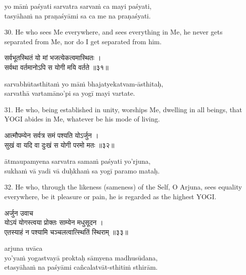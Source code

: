\begin{transliteration}
yo māṁ paśyati sarvatra sarvaṁ ca mayi paśyati, \\
tasyāhaṁ na praṇaśyāmi sa ca me na praṇaśyati.
\end{transliteration}

30. He who sees Me everywhere, and sees everything in Me, he never gets
separated from Me, nor do I get separated from him.

\begin{gitaverse}
सर्वभूतस्थितं यो मां भजत्येकत्वमास्थितः । \\
सर्वथा वर्तमानोऽपि स योगी मयि वर्तते ॥३१॥
\end{gitaverse}

\begin{transliteration}
sarvabhūtasthitaṁ yo māṁ bhajatyekatvam-āsthitaḥ, \\
sarvathā vartamāno'pi sa yogī mayi vartate.
\end{transliteration}

31. He who, being established in unity, worships Me, dwelling in all beings,
that YOGI abides in Me, whatever be his mode of living.

\begin{gitaverse}
आत्मौपम्येन सर्वत्र समं पश्यति योऽर्जुन । \\
सुखं वा यदि वा दुःखं स योगी परमो मतः ॥३२॥
\end{gitaverse}

\begin{transliteration}
ātmaupamyena sarvatra samaṁ paśyati yo'rjuna, \\
sukhaṁ vā yadi vā duḥkhaṁ sa yogī paramo mataḥ.
\end{transliteration}

32. He who, through the likeness (sameness) of the Self, O Arjuna, sees
equality everywhere, be it pleasure or pain, he is regarded as the highest
YOGI.\@

\begin{gitaverse}
अर्जुन उवाच \\
योऽयं योगस्त्वया प्रोक्तः साम्येन मधुसूदन । \\
एतस्याहं न पश्यामि चञ्चलत्वात्स्थितिं स्थिराम् ॥३३॥
\end{gitaverse}

\begin{transliteration}
arjuna uvāca \\
yo'yaṁ yogastvayā proktaḥ sāmyena madhusūdana, \\
etasyāhaṁ na paśyāmi cañcalatvāt-sthitiṁ sthirām.
\end{transliteration}

